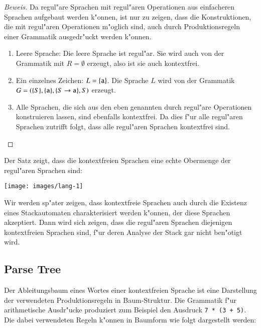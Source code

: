\begin{proof}[Beweis]
Da regul"are Sprachen mit regul"aren Operationen aus einfacheren
Sprachen aufgebaut werden k"onnen, ist nur zu zeigen, dass die
Konstruktionen, die mit regul"aren Operationen m"oglich sind,
auch durch Produktionsregeln einer Grammatik ausgedr"uckt werden
k"onnen. 
\begin{enumerate}
\item Leere Sprache: Die leere Sprache ist regul"ar. Sie wird auch 
von der Grammatik mit $R=\emptyset$ erzeugt, also ist sie auch
kontextfrei.
\item Ein einzelnes Zeichen: $L=\{{\tt a}\}$. Die Sprache $L$ wird von
der Grammatik $G=(\{S\}, \{{\tt a}\}, \{S\to{\tt a}\}, S)$
erzeugt.
\item Alle Sprachen, die sich aus den eben genannten durch regul"are
Operationen konstruieren lassen, sind ebenfalls kontextfrei. Da
dies f"ur alle regul"aren Sprachen zutrifft folgt, dass alle
regul"aren Sprachen kontextfrei sind.
\end{enumerate}
\end{proof}

Der Satz zeigt, dass die kontextfreien Sprachen eine echte
Obermenge der regul"aren Sprachen sind:
\begin{center}
\texttt{[image: images/lang-1]}
\end{center}
Wir werden sp"ater zeigen, dass kontextfreie Sprachen auch durch
die Existenz eines Stackautomaten charakterisiert werden k"onnen,
der diese Sprachen akzeptiert. Dann wird sich zeigen, dass 
die regul"aren Sprachen diejenigen kontextfreien Sprachen sind,
f"ur deren Analyse der Stack gar nicht ben"otigt wird.

\subsection{Parse Tree}
Der Ableitungsbaum eines Wortes einer kontextfreien Sprache
ist eine Darstellung der verwendeten Produktionsregeln in Baum-Struktur.
Die Grammatik f"ur arithmetische Ausdr"ucke produziert zum Beispiel
den Ausdruck {\tt 7 * (3 + 5)}.
Die dabei verwendeten Regeln k"onnen in Baumform wie folgt
dargestellt werden:

